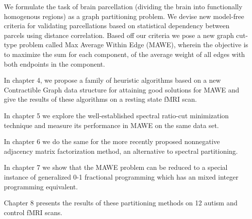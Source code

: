 We formulate the task of brain parcellation (dividing the
brain into functionally homogenous regions) as a graph
partitioning problem. We devise new model-free criteria
for validating parcellations based on statistical
dependency between parcels using distance correlation.
Based off our criteria we pose a new graph cut-type
problem called Max Average Within Edge (MAWE), wherein the
objective is to maximize the sum for each component, of
the average weight of all edges with both endpoints in the
component.

In chapter 4, we propose a family of heuristic algorithms
based on a new Contractible Graph data structure for
attaining good solutions for MAWE and give the results
of these algorithms on a resting state fMRI scan.

In chapter 5 we explore the well-established spectral
ratio-cut minimization technique and measure its
performance in MAWE on the same data set.

In chapter 6 we do the same for the more recently proposed
nonnegative adjacency matrix factorization method,
an alternative to spectral partitioning.

In chapter 7 we show that the MAWE problem can be
reduced to a special instance of generalized 0-1
fractional programming which has an mixed integer programming
equivalent.

Chapter 8 presents the results of these partitioning methods
on 12 autism and control fMRI scans.
